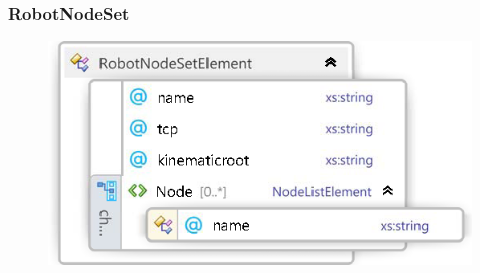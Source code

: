 \documentclass{book}
\begin{document}
\subsubsection{RobotNodeSet}
\begin{figure}[H]
	\centering
	\includegraphics[scale = 0.3]{Xsd_RobotNodeSet}
\end{figure}
\end{document}
